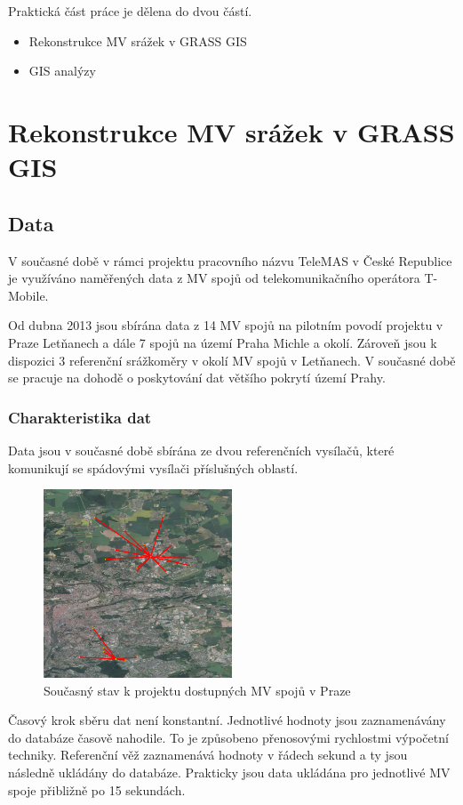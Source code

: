 \documentclass[a4paper,12pt]{report}
\begin{document}
Praktická část práce je dělena do dvou částí.

\begin{itemize}
\item Rekonstrukce MV srážek v GRASS GIS
\item GIS analýzy
\end{itemize}


\section{Rekonstrukce MV srážek v GRASS GIS}

\subsection{Data}  
V současné době v rámci projektu pracovního názvu TeleMAS v České Republice je  využíváno naměřených data z MV spojů od telekomunikačního operátora T-Mobile. 

Od dubna 2013 jsou sbírána data z 14 MV spojů na pilotním povodí projektu v Praze Letňanech a dále 7 spojů na území Praha Michle a okolí. Zároveň jsou k dispozici 3 referenční srážkoměry v okolí MV spojů v Letňanech.
V současné době se pracuje na dohodě o poskytování dat většího pokrytí území Prahy.

\subsubsection*{ Charakteristika dat} Data jsou v současné době sbírána ze dvou referenčních vysílačů, které komunikují se spádovými vysílači příslušných oblastí. 

\begin{figure}[h!]
    \centering
    \includegraphics[width=0.5\textwidth]{./img/letnany.png}
    \caption[Snapshot model]{Současný stav k projektu dostupných MV spojů v Praze  \centering  }
        \label{fig:snapshot}
 \end{figure} 
Časový krok sběru dat není konstantní. Jednotlivé hodnoty jsou zaznamenávány do databáze časově nahodile. To je způsobeno přenosovými rychlostmi výpočetní techniky.  Referenční věž zaznamenává hodnoty v řádech sekund a ty jsou následně ukládány do databáze. Prakticky jsou data ukládána pro jednotlivé MV spoje přibližně po 15 sekundách. 
\end{document}
